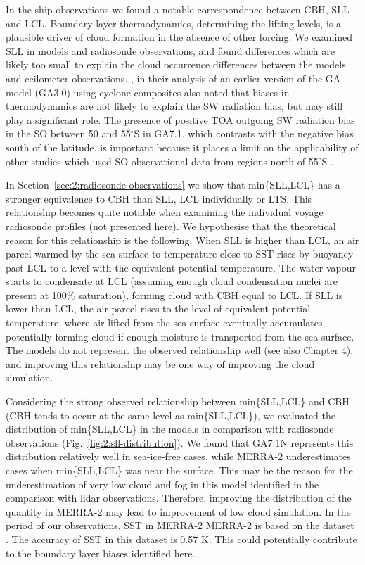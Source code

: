 In the ship observations we found a notable correspondence between CBH, SLL and
LCL. Boundary layer thermodynamics, determining the lifting levels, is a
plausible driver of cloud formation in the absence of other forcing. We
examined SLL in models and radiosonde observations, and found differences which
are likely too small to explain the cloud occurrence differences between the
models and ceilometer observations. \cite{bodas-salcedo2012}, in their analysis
of an earlier version of the GA model (GA3.0) using cyclone composites also
noted that biases in thermodynamics are not likely to explain the SW radiation
bias, but may still play a significant role. The presence of positive TOA
outgoing SW radiation bias in the SO between 50 and 55$^\circ$S in GA7.1, which
contrasts with the negative bias south of the latitude, is important because it
places a limit on the applicability of other studies which used SO
observational data from regions north of 55$^\circ$S \citep{lang2018}.

In Section~\ref{sec:2:radiosonde-observations} we show that min\{SLL,LCL\} has a
stronger equivalence to CBH than SLL, LCL individually or LTS.  This
relationship becomes quite notable when examining the individual voyage
radiosonde profiles (not presented here). We hypothesise that the theoretical
reason for this relationship is the following. When SLL is higher than LCL, an
air parcel warmed by the sea surface to temperature close to SST rises by
buoyancy past LCL to a level with the equivalent potential temperature.  The
water vapour starts to condensate at LCL (assuming enough cloud condensation
nuclei are present at 100\% saturation), forming cloud with CBH equal to LCL.
If SLL is lower than LCL, the air parcel rises to the level of equivalent
potential temperature, where air lifted from the sea surface eventually
accumulates, potentially forming cloud if enough moisture is transported from
the sea surface. The models do not represent the observed relationship well (see also Chapter 4),
and improving this relationship may be one way of improving the cloud
simulation.

Considering the strong observed relationship between min\{SLL,LCL\} and CBH
(CBH tends to occur at the same level as min\{SLL,LCL\}), we evaluated the
distribution of min\{SLL,LCL\} in the models in comparison with radiosonde
observations (Fig.~\ref{fig:2:sll-distribution}). We found that GA7.1N
represents this distribution relatively well in sea-ice-free cases, while
MERRA-2 underestimates cases when min\{SLL,LCL\} was near the surface. This may
be the reason for the underestimation of very low cloud and fog in this model
identified in the comparison with lidar observations. Therefore, improving the
distribution of the quantity in MERRA-2 may lead to improvement of low cloud
simulation.
In the period of our observations, SST in MERRA-2 MERRA-2 is based on the \cite{donlon2012}
dataset \citep{gelaro2017}. The accuracy of SST in this dataset is 0.57 K.
This could potentially contribute to the boundary layer biases identified here.


